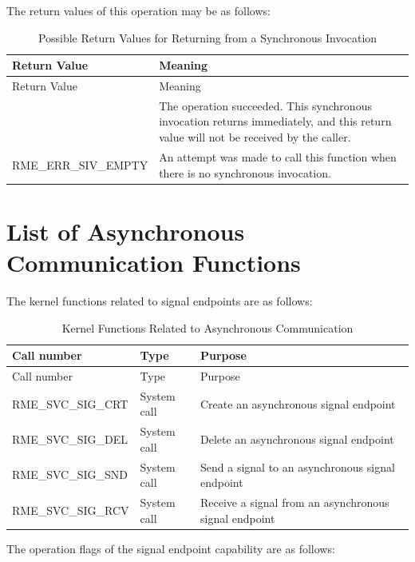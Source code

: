 The return values of this operation may be as follows:

\begin{xltabular}{\textwidth}{@{}>{\hsize\raggedright\arraybackslash}X>{\hsize\raggedright\arraybackslash}X@{}}
\caption{Possible Return Values for Returning from a Synchronous Invocation}\label{tab:5-13-return-from-sync-invocation-return-values}\\
\toprule
Return Value & Meaning\tabularnewline
\endfirsthead
\toprule
Return Value & Meaning\tabularnewline
\midrule
\endhead
\bottomrule
{} & The operation succeeded. This synchronous invocation returns immediately, and this return value will not be received by the caller.\tabularnewline
    RME\_ERR\_SIV\_EMPTY & An attempt was made to call this function when there is no synchronous invocation.\tabularnewline
\end{xltabular}
\nopagebreak[4]

\section{List of Asynchronous Communication Functions}\label{sec:5-async-communication-function-list}

The kernel functions related to signal endpoints are as follows:

\begin{xltabular}{\textwidth}{@{}>{\hsize\raggedright\arraybackslash}X>{\hsize\raggedright\arraybackslash}X>{\hsize\raggedright\arraybackslash}X@{}}
\caption{Kernel Functions Related to Asynchronous Communication}\label{tab:5-14-async-communication-kernel-functions}\\
\toprule
Call number & Type & Purpose\tabularnewline
\endfirsthead
\toprule
Call number & Type & Purpose\tabularnewline
\midrule
\endhead
\bottomrule
\endlastfoot
RME\_SVC\_SIG\_CRT & System call & Create an asynchronous signal endpoint\tabularnewline
RME\_SVC\_SIG\_DEL & System call & Delete an asynchronous signal endpoint\tabularnewline
RME\_SVC\_SIG\_SND & System call & Send a signal to an asynchronous signal endpoint\tabularnewline
RME\_SVC\_SIG\_RCV & System call & Receive a signal from an asynchronous signal endpoint\tabularnewline
\end{xltabular}
\nopagebreak[4]

The operation flags of the signal endpoint capability are as follows:

